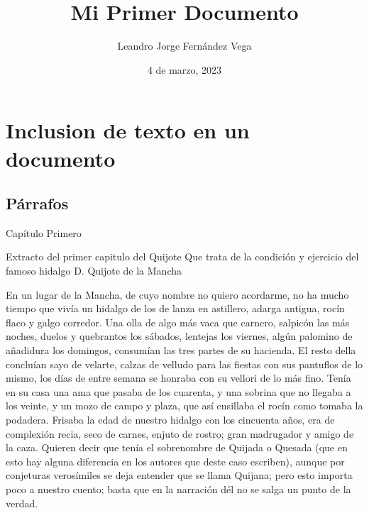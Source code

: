 \documentclass[a4paper,12pt]{article} %
\title{Mi Primer Documento}
\author{Leandro Jorge Fernández Vega}
\date{4 de marzo, 2023}
\begin{document}
\maketitle
\tableofcontents




\section{Inclusion de texto en un documento}

\subsection{Párrafos}


Capítulo Primero 

Extracto del primer capitulo del Quijote \cite{Cer1605}
Que trata de la condición y ejercicio del famoso hidalgo D. Quijote de la Mancha

En un lugar de la Mancha, de cuyo nombre no quiero acordarme, no ha mucho tiempo que vivía un hidalgo de los de lanza en astillero, adarga antigua, rocín flaco y galgo corredor. Una olla de algo más vaca que carnero, salpicón las más noches, duelos y quebrantos los sábados, lentejas los viernes, algún palomino de añadidura los domingos, consumían las tres partes de su hacienda. El resto della concluían sayo de velarte, calzas de velludo para las fiestas con sus pantuflos de lo mismo, los días de entre semana se honraba con su vellori de lo más fino. Tenía en su casa una ama que pasaba de los cuarenta, y una sobrina que no llegaba a los veinte, y un mozo de campo y plaza, que así ensillaba el rocín como tomaba la podadera. Frisaba la edad de nuestro hidalgo con los cincuenta años, era de complexión recia, seco de carnes, enjuto de rostro; gran madrugador y amigo de la caza. Quieren decir que tenía el sobrenombre de Quijada o Quesada (que en esto hay alguna diferencia en los autores que deste caso escriben), aunque por conjeturas verosímiles se deja entender que se llama Quijana; pero esto importa poco a nuestro cuento; basta que en la narración dél no se salga un punto de la verdad.
\end{document}
